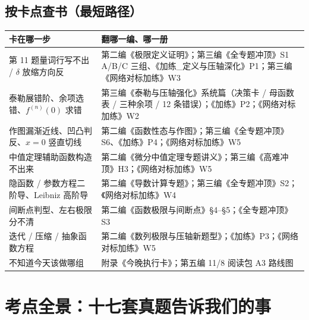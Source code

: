 \documentclass[11pt,a4paper]{ctexart}
\begin{document}
\subsection{按卡点查书（最短路径）}
\begin{longtable}{@{}p{4.6cm}p{10.4cm}@{}}
\toprule
\textbf{卡在哪一步} & \textbf{翻哪一编、哪一册} \\
\midrule
第 11 题量词行写不出 / $\delta$ 放缩方向反 & 第二编《极限定义证明》；第三编《全专题冲顶》S1 A/B/C 三组、《加练\_定义与压轴深化》P1；第三编《网络对标加练》W3 \\
泰勒展错阶、余项选错、$f^{(n)}(0)$ 求错 & 第三编《泰勒与压轴强化》系统篇（决策卡 / 母函数表 / 三种余项 / 12 条错误）；《加练》P2；《网络对标加练》W2 \\
作图漏渐近线、凹凸判反、$x=0$ 竖直切线 & 第二编《函数性态与作图》；第三编《全专题冲顶》S6、《加练》P4；《网络对标加练》W5 \\
中值定理辅助函数构造不出来 & 第二编《微分中值定理专题讲义》；第三编《高难冲顶》H3；《网络对标加练》W5 \\
隐函数 / 参数方程二阶导、Leibniz 高阶导 & 第二编《导数计算专题》；第三编《全专题冲顶》S2；《网络对标加练》W4 \\
间断点判型、左右极限分不清 & 第二编《函数极限与间断点》\S4--\S5；《全专题冲顶》S3 \\
迭代 / 压缩 / 抽象函数方程 & 第二编《数列极限与压轴新题型》；《加练》P3；《网络对标加练》W5 \\
不知道今天该做哪组 & 附录《今晚执行卡》；第五编 11/8 阅读包 A3 路线图 \\
\bottomrule
\end{longtable}

\newpage
\section{考点全景：十七套真题告诉我们的事}
\end{document}
